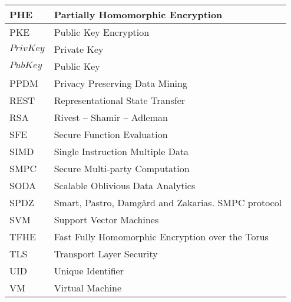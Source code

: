 \begin{center}
\begin{longtable}{| l @{\qquad} | l |}
	PHE       & Partially Homomorphic Encryption \\ \hline
	PKE 			& Public Key Encryption \\ \hline
	$PrivKey$	& Private Key \\ \hline
	$PubKey$  & Public Key \\ \hline
	PPDM      & Privacy Preserving Data Mining \\ \hline
	REST      & Representational State Transfer \\ \hline
	RSA				& Rivest -- Shamir -- Adleman \\ \hline
	SFE       & Secure Function Evaluation \\ \hline
	SIMD      & Single Instruction Multiple Data \\ \hline
	SMPC 			& Secure Multi-party Computation \\ \hline
	SODA 			& Scalable Oblivious Data Analytics \\ \hline
	SPDZ      & Smart, Pastro, Damg{\aa}rd and Zakarias. SMPC protocol \\ \hline
	SVM 			& Support Vector Machines \\ \hline
	TFHE      & Fast Fully Homomorphic Encryption over the Torus \\ \hline
	TLS 			& Transport Layer Security \\ \hline
	UID 			& Unique Identifier \\ \hline
	VM				& Virtual Machine \\ \hline
	\end{longtable}
\end{center}
